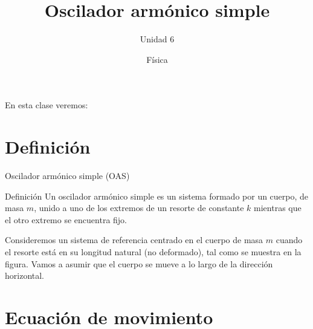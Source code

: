 \documentclass[11pt,handout,aspectratio=1610]{beamer}
\title{Oscilador armónico simple}
\subtitle{Unidad 6}
\author{Física}
\institute{Instituto de Tecnología e Ingeniería \\ \vspace{0.25cm} Universidad Nacional de Hurlingham}
\date{ }
\begin{document}
\frame{\titlepage}

\begin{frame}{En esta clase veremos:}
    \tableofcontents
\end{frame}

\section{Definición}

\begin{frame}{Oscilador armónico simple (OAS)}

\begin{block}{Definición}
    Un oscilador armónico simple es un sistema formado por un cuerpo, de masa $m$, unido a uno de los extremos de un resorte de constante $k$ mientras que el otro extremo se encuentra fijo.
\end{block}

\begin{center}
\end{center} Consideremos un sistema de referencia centrado en el cuerpo de masa $m$ cuando el resorte está en su longitud natural (no deformado), tal como se muestra en la figura. Vamos a asumir que el cuerpo se mueve a lo largo de la dirección horizontal.

\end{frame}

\section{Ecuación de movimiento}
\end{document}
